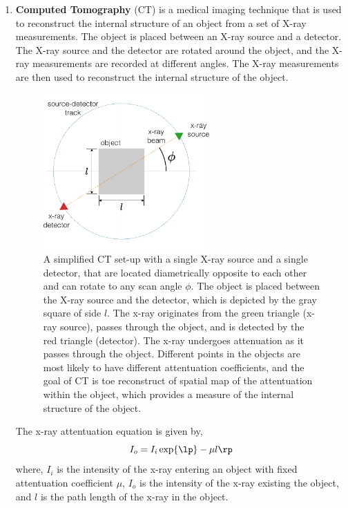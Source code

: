 \begin{enumerate}
    \item \textbf{Computed Tomography} (CT) is a medical imaging technique that is used to reconstruct the internal structure of an object from a set of X-ray measurements. The object is placed between an X-ray source and a detector. The X-ray source and the detector are rotated around the object, and the X-ray measurements are recorded at different angles. The X-ray measurements are then used to reconstruct the internal structure of the object.
    \begin{figure}[h]
        \centering
        \includegraphics[width = 0.6\textwidth]{figure/chapter03/ct_setup_full.pdf}
        \caption{A simplified CT set-up with a single X-ray source and a single detector, that are located diametrically opposite to each other and can rotate to any scan angle $\phi$. The object is placed between the X-ray source and the detector, which is depicted by the gray square of side $l$. The x-ray originates from the green triangle (x-ray source), passes through the object, and is detected by the red triangle (detector). The x-ray undergoes attenuation as it passes through the object. Different points in the objects are most likely to have different attentuation coefficients, and the goal of CT is toe reconstruct of spatial map of the attentuation within the object, which provides a measure of the internal structure of the object.}
        \label{fig:ct}
    \end{figure}
    
    The x-ray attentuation equation is given by,
    \[ I_o = I_i \exp\lp -\mu l \rp \]
    where, $I_i$ is the intensity of the x-ray entering an object with fixed attentuation coefficient $\mu$, $I_o$ is the intensity of the x-ray existing the object, and $l$ is the path length of the x-ray in the object. 
    

\end{enumerate}
